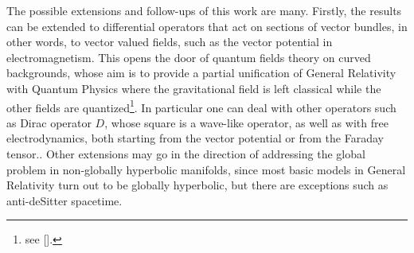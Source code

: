 \thispagestyle{empty}
\noindent The possible extensions and follow-ups of this work are many. Firstly, the results can be extended to differential operators that act on sections of vector bundles, in other words, to vector valued fields, such as the vector potential in electromagnetism. This opens the door of quantum fields theory on curved backgrounds, whose aim is to provide a partial unification of General Relativity with Quantum Physics where the gravitational field is left classical while the other fields are quantized\footnote{see [\citealp{hack}].}. In particular one can deal with other operators such as Dirac operator $D$, whose square is a wave-like operator, as well as with free electrodynamics, both starting from the vector potential or from the Faraday tensor..
Other extensions may go in the direction of addressing the global problem in non-globally hyperbolic manifolds, since most basic models in
General Relativity turn out to be globally hyperbolic, but there are exceptions such as
anti-deSitter spacetime.

\thispagestyle{plain}

